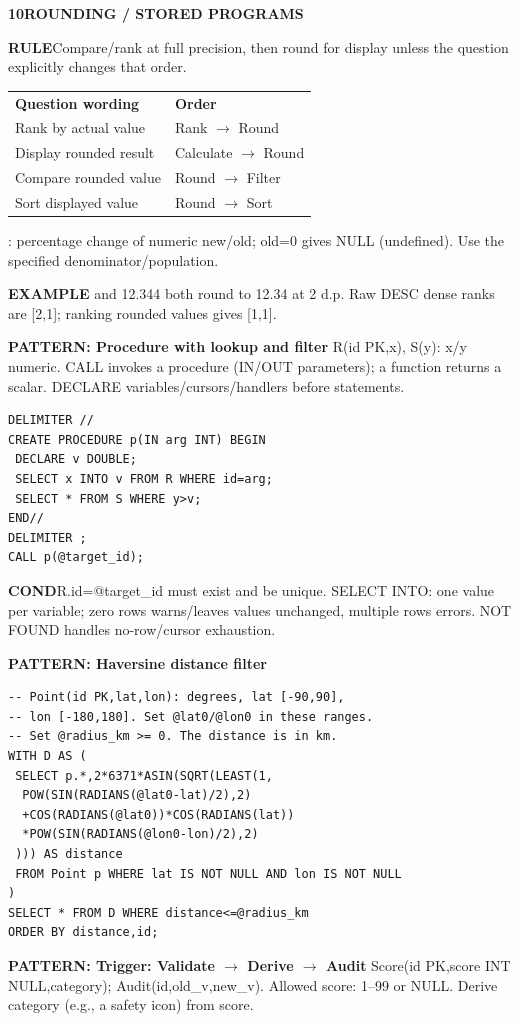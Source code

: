 \documentclass[a4paper]{article}
\newcommand{\sqlfont}{\ttfamily}
\newcommand{\bodyfontsize}{5.55}
\newcommand{\bodyleading}{5.3}
\newcommand{\bodylineskiplimit}{-2pt}
\newcommand{\bodystyle}{%
  \fontsize{\bodyfontsize}{\bodyleading}\selectfont\setlength{\lineskiplimit}{\bodylineskiplimit}\RaggedRight
  \setlength{\abovedisplayskip}{.5pt}\setlength{\belowdisplayskip}{.5pt}%
  \setlength{\abovedisplayshortskip}{.3pt}\setlength{\belowdisplayshortskip}{.3pt}}
\newcommand{\topic}[2]{\par\addvspace{.45pt}\nointerlineskip%
  \begingroup\setlength{\fboxsep}{0.35pt}%
  \noindent\colorbox{structure}{\parbox{\dimexpr\linewidth-2\fboxsep\relax}{%
    \color{white}\fontsize{6.45}{6.8}\selectfont\bfseries #1\enspace #2}}%
  \endgroup\par\nobreak\vspace{.55pt}\nointerlineskip\nobreak}
\newenvironment{topicblock}
  {\par\bodystyle}
  {\par}
\newcommand{\key}[1]{\par\textcolor{structure}{\textbf{#1}}\enspace}
\newcommand{\note}[4]{\par\nointerlineskip\vspace{.25pt}\begingroup\setlength{\fboxsep}{0.1pt}%
  \noindent\colorbox{#1}{\parbox{\dimexpr\linewidth-2\fboxsep\relax}{%
    \RaggedRight\textcolor{#2}{\textbf{#3}}\enspace #4}}%
  \endgroup\par\nointerlineskip\vspace{.25pt}}
\newcommand{\cond}[1]{\note{conditionbg}{condition}{COND}{#1}}
\newcommand{\ex}[1]{\note{examplebg}{example}{EXAMPLE}{#1}}
\newcommand{\ruleline}[1]{\key{RULE}#1\par}
\newcommand{\pattern}[1]{\key{PATTERN: #1}}
\newcommand{\sql}[1]{{\sqlfont\color{sqltext}\detokenize{#1}}}
\newlength{\sheetwidth}
\newenvironment{sheetcolumns}[1]
  {\noindent\begin{minipage}[t]{#1\sheetwidth}\vspace{0pt}\bodystyle\ignorespaces}
  {\end{minipage}\par}
\begin{document}
\begin{sheetcolumns}{.254}
\begin{topicblock}
\topic{10}{ROUNDING / STORED PROGRAMS}
\ruleline{Compare/rank at full precision, then round for display unless the question explicitly changes that order.}
\par\begin{tabular}{@{}ll@{}}
\textbf{Question wording} & \textbf{Order}\\
Rank by actual value & Rank $\to$ Round\\
Display rounded result & Calculate $\to$ Round\\
Compare rounded value & Round $\to$ Filter\\
Sort displayed value & Round $\to$ Sort
\end{tabular}\par
\sql{100.0*(new-old)/NULLIF(old,0)}: percentage change of numeric new/old; old=0 gives NULL (undefined). Use the specified denominator/population.
\ex{12.341 and 12.344 both round to 12.34 at 2 d.p. Raw DESC dense ranks are [2,1]; ranking rounded values gives [1,1].}
\pattern{Procedure with lookup and filter}
R(id PK,x), S(y): x/y numeric. CALL invokes a procedure (IN/OUT parameters); a function returns a scalar. DECLARE variables/cursors/handlers before statements.
\begin{lstlisting}
DELIMITER //
CREATE PROCEDURE p(IN arg INT) BEGIN
 DECLARE v DOUBLE;
 SELECT x INTO v FROM R WHERE id=arg;
 SELECT * FROM S WHERE y>v;
END//
DELIMITER ;
CALL p(@target_id);
\end{lstlisting}
\cond{R.id=@target\_id must exist and be unique. SELECT INTO: one value per variable; zero rows warns/leaves values unchanged, multiple rows errors. NOT FOUND handles no-row/cursor exhaustion.}
\pattern{Haversine distance filter}
\begin{lstlisting}
-- Point(id PK,lat,lon): degrees, lat [-90,90],
-- lon [-180,180]. Set @lat0/@lon0 in these ranges.
-- Set @radius_km >= 0. The distance is in km.
WITH D AS (
 SELECT p.*,2*6371*ASIN(SQRT(LEAST(1,
  POW(SIN(RADIANS(@lat0-lat)/2),2)
  +COS(RADIANS(@lat0))*COS(RADIANS(lat))
  *POW(SIN(RADIANS(@lon0-lon)/2),2)
 ))) AS distance
 FROM Point p WHERE lat IS NOT NULL AND lon IS NOT NULL
)
SELECT * FROM D WHERE distance<=@radius_km
ORDER BY distance,id;
\end{lstlisting}
\pattern{Trigger: Validate $\to$ Derive $\to$ Audit}
Score(id PK,score INT NULL,category); Audit(id,old\_v,new\_v). Allowed score: 1--99 or NULL. Derive category (e.g., a safety icon) from score.
\begin{lstlisting}

\end{lstlisting}
\end{topicblock}
\end{sheetcolumns}
\end{document}

